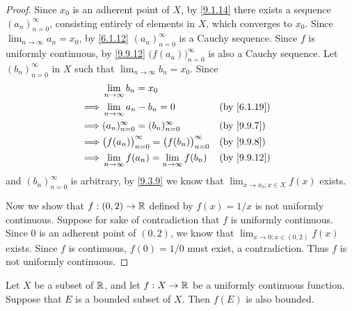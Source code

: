 \begin{proof}
  Since \(x_0\) is an adherent point of \(X\), by \cref{9.1.14} there exists a sequence \((a_n)_{n = 0}^\infty\), consisting entirely of elements in \(X\), which converges to \(x_0\).
  Since \(\lim_{n \to \infty} a_n = x_0\), by \cref{6.1.12} \((a_n)_{n = 0}^\infty\) is a Cauchy sequence.
  Since \(f\) is uniformly continuous, by \cref{9.9.12} \(\big(f(a_n)\big)_{n = 0}^\infty\) is also a Cauchy sequence.
  Let \((b_n)_{n = 0}^\infty\) in \(X\) such that \(\lim_{n \to \infty} b_n = x_0\).
  Since
  \begin{align*}
             & \lim_{n \to \infty} b_n = x_0                                                                    \\
    \implies & \lim_{n \to \infty} a_n - b_n = 0                                 &  & \text{(by \cref{6.1.19})} \\
    \implies & (a_n)_{n = 0}^\infty = (b_n)_{n = 0}^\infty                       &  & \by{9.9.7}                \\
    \implies & \big(f(a_n)\big)_{n = 0}^\infty = \big(f(b_n)\big)_{n = 0}^\infty &  & \by{9.9.8}                \\
    \implies & \lim_{n \to \infty} f(a_n) = \lim_{n \to \infty} f(b_n)           &  & \text{(by \cref{9.9.12})}
  \end{align*}
  and \((b_n)_{n = 0}^\infty\) is arbitrary, by \cref{9.3.9} we know that \(\lim_{x \to x_0 ; x \in X} f(x)\) exists.

  Now we show that \(f : (0, 2) \to \mathbb{R}\) defined by \(f(x) = 1 / x\) is not uniformly continuous.
  Suppose for sake of contradiction that \(f\) is uniformly continuous.
  Since \(0\) is an adherent point of \((0, 2)\), we know that \(\lim_{x \to 0 ; x \in (0, 2)} f(x)\) exists.
  Since \(f\) is continuous, \(f(0) = 1 / 0\) must exist, a contradiction.
  Thus \(f\) is not uniformly continuous.
\end{proof}

\begin{prop}\label{9.9.15}
  Let \(X\) be a subset of \(\mathbb{R}\), and let \(f : X \to \mathbb{R}\) be a uniformly continuous function.
  Suppose that \(E\) is a bounded subset of \(X\).
  Then \(f(E)\) is also bounded.
\end{prop}

